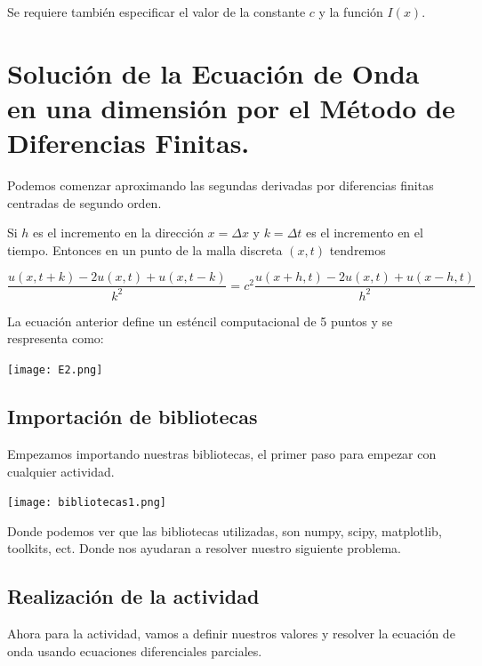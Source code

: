 \documentclass[12pt]{article}
\begin{document}
Se requiere también especificar el valor de la constante $c$ y la función $I(x)$.

\section{Solución de la Ecuación de Onda en una dimensión por el Método de Diferencias Finitas.}

Podemos comenzar aproximando las segundas derivadas por diferencias finitas centradas de segundo orden.

Si $h$ es el incremento en la dirección $x=\Delta x$ y $k=\Delta t$ es el incremento en el tiempo. Entonces en un punto de la malla discreta $(x,t)$ tendremos

\begin{equation*}
\frac{u(x,t+k) -2u(x,t) + u(x,t-k)}{k^2} = c^2
\frac{u(x+h,t) -2u(x,t) + u(x-h,t)}{h^2}
\end{equation*}

La ecuación anterior define un esténcil computacional de 5 puntos y se respresenta como:

\begin{center}
    \texttt{[image: E2.png]}
\end{center}




\subsection{Importación de bibliotecas}
Empezamos importando nuestras bibliotecas, el primer paso para empezar con cualquier actividad.

\begin{center}
    \texttt{[image: bibliotecas1.png]}
\end{center}
 
 Donde podemos ver que las bibliotecas utilizadas, son numpy, scipy, matplotlib, toolkits, ect. Donde nos ayudaran a resolver nuestro siguiente problema.




\subsection{Realización de la actividad}
Ahora para la actividad, vamos a definir nuestros valores y resolver la ecuación de onda usando ecuaciones diferenciales parciales.
\end{document}
